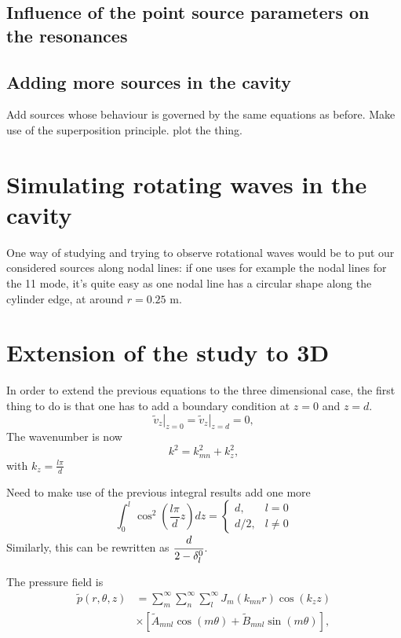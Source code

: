 \documentclass[%
 reprint,
 amsmath,amssymb,
 aip,
]{revtex4-1}
\begin{document}
\subsection{Influence of the point source parameters on the resonances}

\subsection{Adding more sources in the cavity}
Add sources whose behaviour is governed by the same equations as before. Make use of the superposition principle. plot the thing. 

\section{Simulating rotating waves in the cavity}
One way of studying and trying to observe rotational waves would be to put our considered sources along nodal lines: if one uses for example the nodal lines for the 11 mode, it's quite easy as one nodal line has a circular shape along the cylinder edge, at around $r = 0.25$ m.


\section{Extension of the study to 3D}
In order to extend the previous equations to the three dimensional case, the first thing to do is that one has to add a boundary condition at $z=0$ and $z=d$.
\begin{equation}
   \left. \tilde{v}_z \right|_{z=0} = \left. \tilde{v}_z \right|_{z=d} = 0,
\end{equation}
The wavenumber is now
\begin{equation}
    k^2 = k_{mn}^2 + k_z^2,
\end{equation}
with $k_z = \frac{l \pi}{d}$

Need to make use of the previous integral results add one more
\begin{equation}
    \int_0^l \cos^2\left( \frac{l \pi}{d}z \right) dz = 
    \begin{cases}    
        d, & l = 0\\
        d/2, & l \ne 0
    \end{cases} \label{eq:dp_1}
\end{equation}
Similarly, this can be rewritten as $\cfrac{d}{2 - \delta_l^0}$.

The pressure field is
\begin{equation}
    \begin{split}
        \tilde{p}(r, \theta, z) &= \sum_m^{\infty}\sum_n^{\infty}\sum_l^{\infty} J_m(k_{mn}r) \cos(k_z z)\\ &\times \left[ \tilde{A}_{mnl} \cos(m \theta) + \tilde{B}_{mnl} \sin(m \theta) \right],
    \end{split}
\end{equation}
\end{document}
